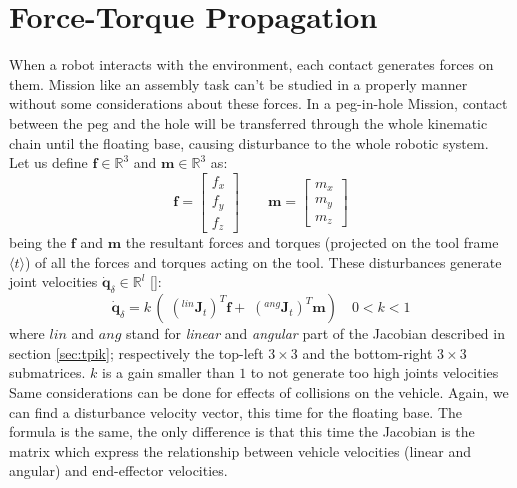\section{Force-Torque Propagation}
\label{sec:forceConsideration}
When a robot interacts with the environment, each contact generates forces on them. Mission like an assembly task can't be studied in a properly manner without some considerations about these forces. In a peg-in-hole Mission, contact between the peg and the hole will be transferred through the whole kinematic chain until the floating base, causing disturbance to the whole robotic system.\\
Let us define $\boldsymbol{f} \in \mathbb{R}^3$ and $\boldsymbol{m} \in \mathbb{R}^3$ as:
\begin{equation}
	\boldsymbol{f} = \begin{bmatrix}f_x \\ f_y \\ f_z\end{bmatrix} \qquad
	\boldsymbol{m} = \begin{bmatrix}m_x \\ m_y \\ m_z\end{bmatrix}
\end{equation}
being the $\boldsymbol{f}$ and $\boldsymbol{m}$ the resultant forces and torques (projected on the tool frame $ \langle t \rangle $) of all the forces and torques acting on the tool. These disturbances generate joint velocities $ \boldsymbol{\dot{q}}_{\delta} \in \mathbb{R}^l$ [\cite{bookSiciliano}]:
\begin{equation}
\label{eq:forTor}
	\boldsymbol{\dot{q}}_{\delta} = k \, (\;(^{lin}\boldsymbol{J}_t)^T \boldsymbol{f} + \;(^{ang}\boldsymbol{J}_t)^T \boldsymbol{m}) \quad 0 < k < 1 
\end{equation}
where $lin$ and $ang$ stand for \textit{linear} and \textit{angular} part of the Jacobian described in section \ref{sec:tpik}; respectively the top-left $3\times 3$ and the bottom-right $3\times 3$ submatrices. $k$ is a gain smaller than $1$ to not generate too high joints velocities\\

Same considerations can be done for effects of collisions on the vehicle. Again, we can find a disturbance velocity vector, this time for the floating base. The formula is the same, the only difference is that this time the Jacobian is the matrix which express the relationship between vehicle velocities (linear and angular) and end-effector velocities.
\vspace*{50px}\\


